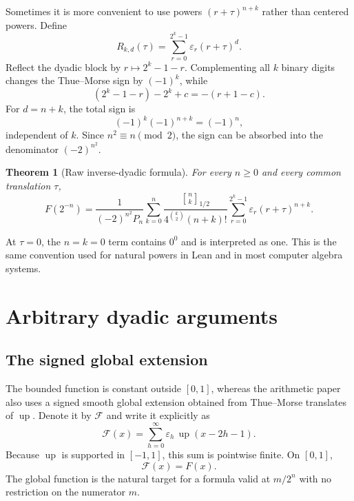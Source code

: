 \documentclass[11pt]{article}
\newtheorem{theorem}{Theorem}[section]
\theoremstyle{definition}
\newcommand{\Fabius}{F}
\newcommand{\Up}{\operatorname{up}}
\newcommand{\eps}{\varepsilon}
\newcommand{\Qbin}[3]{\genfrac{[}{]}{0pt}{}{#1}{#2}_{#3}}
\begin{document}
Sometimes it is more convenient to use powers $(r+\tau)^{n+k}$ rather than centered powers.  Define
\begin{equation}
  R_{k,d}(\tau)=\sum_{r=0}^{2^k-1}\eps_r(r+\tau)^d.
  \label{eq:raw-power-sum}
\end{equation}
Reflect the dyadic block by $r\mapsto2^k-1-r$.  Complementing all $k$ binary digits changes the Thue--Morse sign by $(-1)^k$, while
\[
  (2^k-1-r)-2^k+c=-(r+1-c).
\]
For $d=n+k$, the total sign is
\[
  (-1)^k(-1)^{n+k}=(-1)^n,
\]
independent of $k$.  Since $n^2\equiv n\pmod2$, the sign can be absorbed into the denominator $(-2)^{n^2}$.

\begin{theorem}[Raw inverse-dyadic formula]
For every $n\ge0$ and every common translation $\tau$,
\begin{equation}
\boxed{
  \Fabius(2^{-n})
  =\frac{1}{(-2)^{n^2}P_n}
    \sum_{k=0}^{n}
    \frac{\Qbin{n}{k}{1/2}}
         {4^{\binom{k}{2}}(n+k)!}
    \sum_{r=0}^{2^k-1}
      \eps_r(r+\tau)^{n+k}.}
  \label{eq:raw-inverse-dyadic}
\end{equation}
\end{theorem}

At $\tau=0$, the $n=k=0$ term contains $0^0$ and is interpreted as one.  This is the same convention used for natural powers in Lean and in most computer algebra systems.

\section{Arbitrary dyadic arguments}
\label{sec:arbitrary-dyadic}

\subsection{The signed global extension}

The bounded function is constant outside $[0,1]$, whereas the arithmetic paper also uses a signed smooth global extension obtained from Thue--Morse translates of $\Up$.  Denote it by $\mathcal F$ and write it explicitly as
\begin{equation}
  \mathcal F(x)=\sum_{h=0}^{\infty}\eps_h\,
  \Up(x-2h-1).
  \label{eq:signed-global-extension}
\end{equation}
Because $\Up$ is supported in $[-1,1]$, this sum is pointwise finite.  On $[0,1]$,
\begin{equation}
  \mathcal F(x)=\Fabius(x).
  \label{eq:global-agreement}
\end{equation}
The global function is the natural target for a formula valid at $m/2^n$ with no restriction on the numerator $m$.
\end{document}
